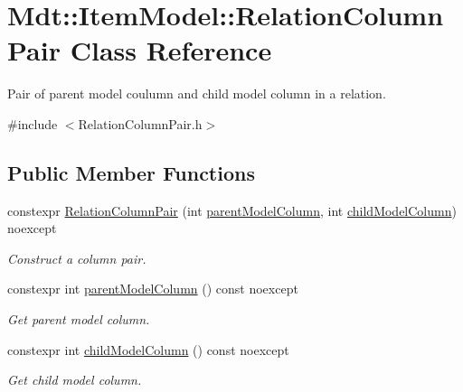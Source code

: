 \hypertarget{class_mdt_1_1_item_model_1_1_relation_column_pair}{}\section{Mdt\+:\+:Item\+Model\+:\+:Relation\+Column\+Pair Class Reference}
\label{class_mdt_1_1_item_model_1_1_relation_column_pair}


Pair of parent model coulumn and child model column in a relation.  




{\ttfamily \#include $<$Relation\+Column\+Pair.\+h$>$}

\subsection*{Public Member Functions}
\begin{DoxyCompactItemize}
\item 
constexpr \hyperlink{class_mdt_1_1_item_model_1_1_relation_column_pair_a395ed12cc00f80a9eb1c57e3d9845a8c}{Relation\+Column\+Pair} (int \hyperlink{class_mdt_1_1_item_model_1_1_relation_column_pair_a42937c5f0dd55123d2b5b8d6e2ba563f}{parent\+Model\+Column}, int \hyperlink{class_mdt_1_1_item_model_1_1_relation_column_pair_a5c6ba20a11c2a358c2c6fcf0d3218ed3}{child\+Model\+Column}) noexcept
\begin{DoxyCompactList}\small\item\em Construct a column pair. \end{DoxyCompactList}\item 
constexpr int \hyperlink{class_mdt_1_1_item_model_1_1_relation_column_pair_a42937c5f0dd55123d2b5b8d6e2ba563f}{parent\+Model\+Column} () const noexcept\hypertarget{class_mdt_1_1_item_model_1_1_relation_column_pair_a42937c5f0dd55123d2b5b8d6e2ba563f}{}\label{class_mdt_1_1_item_model_1_1_relation_column_pair_a42937c5f0dd55123d2b5b8d6e2ba563f}

\begin{DoxyCompactList}\small\item\em Get parent model column. \end{DoxyCompactList}\item 
constexpr int \hyperlink{class_mdt_1_1_item_model_1_1_relation_column_pair_a5c6ba20a11c2a358c2c6fcf0d3218ed3}{child\+Model\+Column} () const noexcept\hypertarget{class_mdt_1_1_item_model_1_1_relation_column_pair_a5c6ba20a11c2a358c2c6fcf0d3218ed3}{}\label{class_mdt_1_1_item_model_1_1_relation_column_pair_a5c6ba20a11c2a358c2c6fcf0d3218ed3}

\begin{DoxyCompactList}\small\item\em Get child model column. \end{DoxyCompactList}\end{DoxyCompactItemize}


